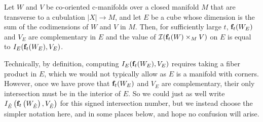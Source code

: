 \begin{lemma}\label{L:intersection signs}
	Let $W$ and $V$ be co-oriented c-manifolds over a closed manifold $M$ that are transverse to a cubulation $|X| \to M$, and let $E$ be a cube whose dimension
	is the sum of the codimensions of $W$ and $V$ in $M$.
	Then, for sufficiently large $t$, $\mathbf{f}_t(W_E)$ and $V_E$ are complementary in $E$ and the value of $\mathcal{I}(\mathbf{f}_t(W) \times_M V)$ on $E$
	is equal to $I_E(\mathbf{f}_t(W_E), V_E)$.
\end{lemma}
\begin{remark}
	Technically, by definition, computing $I_E(\mathbf{f}_t(W_E), V_E)$ requires taking a fiber product in $E$, which we would not typically allow as $E$ is a manifold with corners.
	However, once we have prove that $\mathbf{f}_t(W_E)$ and $V_E$ are complementary, their only intersection must be in the interior of $E$.
	So we could just as well write $I_{\mathring{E}}\left(\mathbf{f}_t\left(W_{\mathring{E}}\right), V_{\mathring{E}}\right)$ for this signed intersection number, but we instead choose the simpler notation here, and in some places below, and hope no confusion will arise.
\end{remark}

